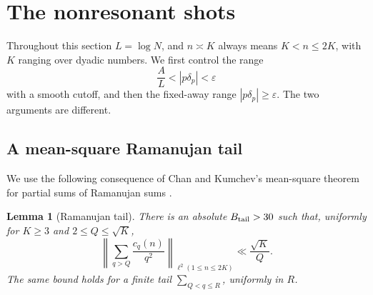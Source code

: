 \documentclass[11pt]{article}
\numberwithin{equation}{section}
\newtheorem{lemma}[theorem]{Lemma}
\theoremstyle{definition}
\newcommand{\1}{\mathbf 1}
\begin{document}
\section{The nonresonant shots}\label{sec:minor}

Throughout this section \(L=\log N\), and \(n\asymp K\) always means
\(K<n\le2K\), with \(K\) ranging over dyadic numbers.  We first control the range
\[
 \frac A L<|p\delta_p|<\varepsilon
\]
with a smooth cutoff, and then the fixed-away range
\(|p\delta_p|\ge\varepsilon\).  The two arguments are different.

\subsection{A mean-square Ramanujan tail}

We use the following consequence of Chan and Kumchev's mean-square
theorem for partial sums of Ramanujan sums
\cite[Theorem 1.2]{ChanKumchev}.

\begin{lemma}[Ramanujan tail]\label{lem:ram-tail}
There is an absolute \(B_{\rm tail}>30\) such that, uniformly for \(K\ge3\)
and \(2\le Q\le \sqrt K\),
\begin{equation}\label{eq:ram-tail}
 \left\|
 \sum_{q>Q}\frac{c_q(n)}{q^2}
 \right\|_{\ell^2(1\le n\le2K)}
 \ll\frac{\sqrt K}{Q}.
\end{equation}
The same bound holds for a finite tail
\(\sum_{Q<q\le R}\), uniformly in \(R\).
\end{lemma}
\end{document}

